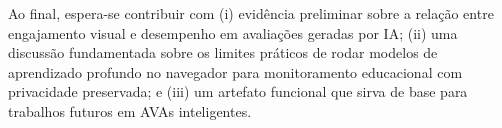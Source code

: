 \documentclass[12pt,a4paper]{article}
\begin{document}
Ao final, espera-se contribuir com (i) evidência preliminar sobre a relação entre engajamento visual e desempenho em avaliações geradas por IA; (ii) uma discussão fundamentada sobre os limites práticos de rodar modelos de aprendizado profundo no navegador para monitoramento educacional com privacidade preservada; e (iii) um artefato funcional que sirva de base para trabalhos futuros em AVAs inteligentes.



\end{document}
